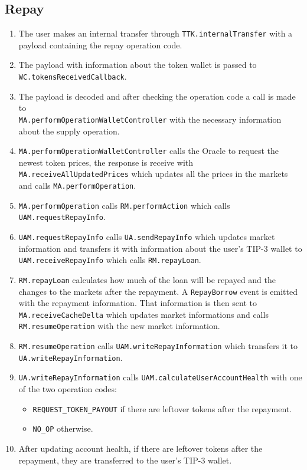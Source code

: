 \subsection{Repay}
\begin{enumerate}
  \item The user makes an internal transfer through \verb|TTK.internalTransfer| with a payload containing the repay operation code.
  \item The payload with information about the token wallet is passed to \verb|WC.tokensReceivedCallback|.
  \item The payload is decoded and after checking the operation code a call is made to \\\verb|MA.performOperationWalletController| with the necessary information about the supply operation.
  \item \verb|MA.performOperationWalletController| calls the Oracle to request the newest token prices, the response is receive with \verb|MA.receiveAllUpdatedPrices| which updates all the prices in the markets and calls \verb|MA.performOperation|.
  \item \verb|MA.performOperation| calls \verb|RM.performAction| which calls \verb|UAM.requestRepayInfo|.
  \item \verb|UAM.requestRepayInfo| calls \verb|UA.sendRepayInfo| which updates market information and transfers it with information about the user's TIP-3 wallet to \verb|UAM.receiveRepayInfo| which calls \verb|RM.repayLoan|.
  \item \verb|RM.repayLoan| calculates how much of the loan will be repayed and the changes to the markets after the repayment. A \verb|RepayBorrow| event is emitted with the repayment information. That information is then sent to \verb|MA.receiveCacheDelta| which updates market informations and calls \verb|RM.resumeOperation| with the new market information.
  \item \verb|RM.resumeOperation| calls \verb|UAM.writeRepayInformation| which transfers it to \\\verb|UA.writeRepayInformation|.
  \item \verb|UA.writeRepayInformation| calls \verb|UAM.calculateUserAccountHealth| with one of the two operation codes:
  \begin{itemize}
    \item \verb|REQUEST_TOKEN_PAYOUT| if there are leftover tokens after the repayment.
    \item \verb|NO_OP| otherwise.
  \end{itemize}
  \item After updating account health, if there are leftover tokens after the repayment, they are transferred to the user's TIP-3 wallet.
\end{enumerate}

